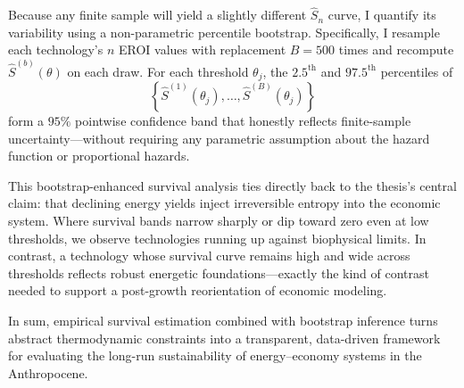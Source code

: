 \documentclass[a4paper,12pt]{article}
\begin{document}
Because any finite sample will yield a slightly different $\widehat{S}_{n}$ curve, I quantify its variability using a non-parametric percentile bootstrap. Specifically, I resample each technology’s $n$ EROI values with replacement $B = 500$ times and recompute $\widehat{S}^{(b)}(\theta)$ on each draw. For each threshold $\theta_j$, the $2.5^{\text{th}}$ and $97.5^{\text{th}}$ percentiles of
\[
    \left\{ \widehat{S}^{(1)}(\theta_j), \dots, \widehat{S}^{(B)}(\theta_j) \right\}
\]
form a $95\%$ pointwise confidence band that honestly reflects finite-sample uncertainty—without requiring any parametric assumption about the hazard function or proportional hazards.

This bootstrap-enhanced survival analysis ties directly back to the thesis’s central claim: that declining energy yields inject irreversible entropy into the economic system. Where survival bands narrow sharply or dip toward zero even at low thresholds, we observe technologies running up against biophysical limits. In contrast, a technology whose survival curve remains high and wide across thresholds reflects robust energetic foundations—exactly the kind of contrast needed to support a post-growth reorientation of economic modeling.

In sum, empirical survival estimation combined with bootstrap inference turns abstract thermodynamic constraints into a transparent, data-driven framework for evaluating the long-run sustainability of energy–economy systems in the Anthropocene.
\end{document}
